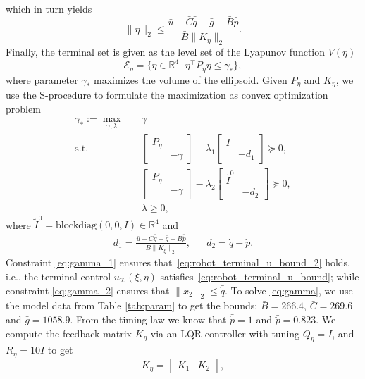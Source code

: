 \documentclass[journal]{IEEEtran}
\newcommand {\matr}[2]{\left[\begin{array}{#1}#2\end{array}\right]}
\begin{document}
	which in turn yields
	\begin{equation}
	\label{eq:robot_terminal_u_bound_2}
	\|\eta\|_2 \leq{} \frac{\bar{u}-\bar{C}\bar{\dot{q}}-\bar{g}-\bar{B}\bar{\ddot{p}}}{\bar{B}\|K_\eta\|_2}.
	\end{equation}
	Finally, the terminal set is given as the level set of the Lyapunov function $V(\eta)$
	\begin{equation}
	\mathcal{E}_\eta= \{\eta\in\mathbb{R}^4\, |\, \eta^\top{}P_\eta \eta\leq{}\gamma_*\},
	\end{equation}
	where parameter $\gamma_*$ maximizes the volume of the ellipsoid. Given $P_\eta$ and $K_\eta$, we use the S-procedure \cite{boyd2004convex} to formulate the maximization as convex optimization problem
	\begin{subequations}\label{eq:gamma}
		\begin{align}
		\gamma_*:=\max_{\gamma,\lambda}\quad & \gamma \\
		\mathrm{s.t.} \quad &\matr{cc}{P_\eta & \\ & -\gamma} - \lambda_1 \matr{cc}{I & \\ & -d_1 } \succeq 0,\label{eq:gamma_1} \\
		&\matr{cc}{P_\eta & \\ & -\gamma} - \lambda_2 \matr{cc}{\tilde{I}^0 & \\ & -d_2 } \succeq 0, \label{eq:gamma_2}\\
		& \lambda \geq 0,
		\end{align}
	\end{subequations}			
	where $\tilde{I}^0=\mathrm{blockdiag}(0,0,I)\in\mathbb{R}^4$ and
	\begin{align*}
	d_1=\frac{\bar{u}-\bar{C}\bar{\dot{q}}-\bar{g}-\bar{B}\bar{\ddot{p}}}{\bar{B}\|K_\xi\|_2}, && d_2 = \bar{\dot{q}}-\bar{\dot{p}}.
	\end{align*}
	Constraint \eqref{eq:gamma_1} ensures that~\eqref{eq:robot_terminal_u_bound_2} holds, i.e., the terminal control $u_\mathcal{X}(\xi,\eta)$ satisfies~\eqref{eq:robot_terminal_u_bound}; while constraint \eqref{eq:gamma_2} ensures that  $\|x_2\|_2\leq{}\bar{\dot{q}}$.
	To solve \eqref{eq:gamma}, we use the model data from Table \ref{tab:param} to get the bounds: $\bar{B}=266.4$, $\bar{C}=269.6$ and $\bar{g}=1058.9$. From the timing law we know that $\bar{\dot{p}}=1$ and $\bar{\ddot{p}}=0.823$. We compute the feedback matrix $K_\eta$ via an LQR controller with tuning $Q_\eta=I$, and $R_\eta=10I$ to get 
	\begin{equation}
	K_\eta=\matr{cc}{K_1 & K_2},
	\end{equation}
\end{document}
